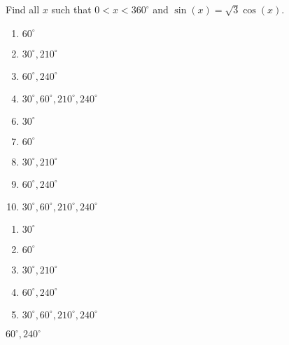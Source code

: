 



  Find all $x$ such that $0<x<360^\circ$ and $\sin(x)=\sqrt{3}\cos(x)$.


\ifsat
	\begin{enumerate}[label=\Alph*)]
		\item  $60^\circ$ 
		\item $30^\circ, 210^\circ$
		\item $60^\circ, 240^\circ$ %
		\item  $30^\circ, 60^\circ, 210^\circ,240^\circ$
	\end{enumerate}
\else
\fi

\ifacteven
	\begin{enumerate}[label=\textbf{\Alph*.},itemsep=\fill,align=left]
		\setcounter{enumii}{5}
		\item    $30^\circ$
		\item  $60^\circ$ 
		\item $30^\circ, 210^\circ$
		\addtocounter{enumii}{1}
		\item $60^\circ, 240^\circ$ %
		\item  $30^\circ, 60^\circ, 210^\circ,240^\circ$
	\end{enumerate}
\else
\fi

\ifactodd
	\begin{enumerate}[label=\textbf{\Alph*.},itemsep=\fill,align=left]
		\item    $30^\circ$
		\item  $60^\circ$ 
		\item $30^\circ, 210^\circ$
		\item $60^\circ, 240^\circ$ %
		\item  $30^\circ, 60^\circ, 210^\circ,240^\circ$
	\end{enumerate}
\else
\fi

\ifgridin
 $60^\circ, 240^\circ$ %
		
\else
\fi

